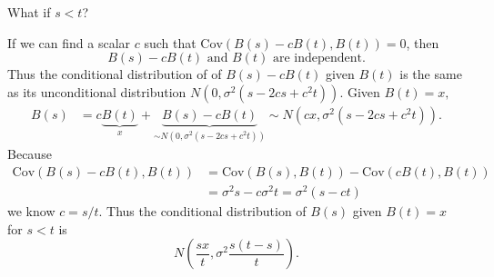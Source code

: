 \documentclass[letterpaper]{beamer}
\def\E{\mathbb E}
\def\V{\mathrm{Var}}
\def\CV{\mathrm{Cov}}
\begin{document}
\begin{frame}
What if $s<t$?\bigskip

If we can find a scalar $c$ such that $\CV(B(s)-cB(t),B(t))=0$,
then
$$
B(s)-cB(t)\text{ and $B(t)$ are independent.}
$$
Thus the conditional distribution of of $B(s)-c B(t)$ given $B(t)$ is the same as its unconditional distribution $N(0,\sigma^2(s-2cs+c^2t)).$
Given $B(t)=x,$
\begin{align*}
B(s)&=c\underbrace{B(t)}_{x}+\underbrace{B(s)-cB(t)}_{\sim N(0,\sigma^2(s-2cs+c^2t))}
\sim N\left(cx,\sigma^2(s-2cs+c^2t)\right).
\end{align*}
Because
\begin{align*}
\CV(B(s)-cB(t),B(t))&=\CV(B(s),B(t))-\CV(cB(t),B(t))\\
&=\sigma^2s-c\sigma^2t=\sigma^2(s-ct)
\end{align*}
we know $c=s/t$. Thus the conditional distribution of $B(s)$ given $B(t)=x$ for $s<t$ is
$$ N\left(\frac{sx}{t},\sigma^2\frac{s(t-s)}{t}\right).$$
\end{frame}
%
\end{document}
